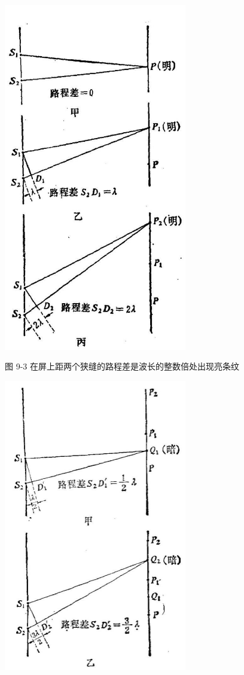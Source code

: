 \documentclass[10pt]{article}
\begin{document}
\begin{center}
\includegraphics[max width=0.6\textwidth]{images/01913056-1f15-74d8-9184-9aab52c9d66b_301_314357.jpg}
\end{center}

图 9-3 在屏上距两个狭缝的路程差是波长的整数倍处出现亮条纹

\begin{center}
\includegraphics[max width=0.6\textwidth]{images/01913056-1f15-74d8-9184-9aab52c9d66b_302_898109.jpg}
\end{center}
\end{document}
